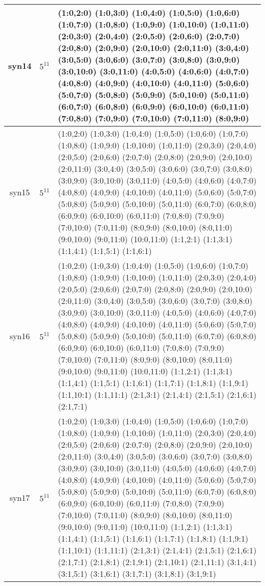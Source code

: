 \documentclass[10pt,journal,compsoc]{IEEEtran}
\begin{document}
\begin{table*}[htbp]
\begin{tabular}{|c|c|m{}|}
syn14 & $5^{11}$ & (1:0,2:0) (1:0,3:0) (1:0,4:0) (1:0,5:0) (1:0,6:0) (1:0,7:0) (1:0,8:0) (1:0,9:0) (1:0,10:0) (1:0,11:0) (2:0,3:0) (2:0,4:0) (2:0,5:0) (2:0,6:0) (2:0,7:0) (2:0,8:0) (2:0,9:0) (2:0,10:0) (2:0,11:0) (3:0,4:0) (3:0,5:0) (3:0,6:0) (3:0,7:0) (3:0,8:0) (3:0,9:0) (3:0,10:0) (3:0,11:0) (4:0,5:0) (4:0,6:0) (4:0,7:0) (4:0,8:0) (4:0,9:0) (4:0,10:0) (4:0,11:0) (5:0,6:0) (5:0,7:0) (5:0,8:0) (5:0,9:0) (5:0,10:0) (5:0,11:0) (6:0,7:0) (6:0,8:0) (6:0,9:0) (6:0,10:0) (6:0,11:0) (7:0,8:0) (7:0,9:0) (7:0,10:0) (7:0,11:0) (8:0,9:0)  \\ \hline
syn15 & $5^{11}$ & (1:0,2:0) (1:0,3:0) (1:0,4:0) (1:0,5:0) (1:0,6:0) (1:0,7:0) (1:0,8:0) (1:0,9:0) (1:0,10:0) (1:0,11:0) (2:0,3:0) (2:0,4:0) (2:0,5:0) (2:0,6:0) (2:0,7:0) (2:0,8:0) (2:0,9:0) (2:0,10:0) (2:0,11:0) (3:0,4:0) (3:0,5:0) (3:0,6:0) (3:0,7:0) (3:0,8:0) (3:0,9:0) (3:0,10:0) (3:0,11:0) (4:0,5:0) (4:0,6:0) (4:0,7:0) (4:0,8:0) (4:0,9:0) (4:0,10:0) (4:0,11:0) (5:0,6:0) (5:0,7:0) (5:0,8:0) (5:0,9:0) (5:0,10:0) (5:0,11:0) (6:0,7:0) (6:0,8:0) (6:0,9:0) (6:0,10:0) (6:0,11:0) (7:0,8:0) (7:0,9:0) (7:0,10:0) (7:0,11:0) (8:0,9:0) (8:0,10:0) (8:0,11:0) (9:0,10:0) (9:0,11:0) (10:0,11:0) (1:1,2:1) (1:1,3:1) (1:1,4:1) (1:1,5:1) (1:1,6:1)  \\ \hline
syn16 & $5^{11}$ & (1:0,2:0) (1:0,3:0) (1:0,4:0) (1:0,5:0) (1:0,6:0) (1:0,7:0) (1:0,8:0) (1:0,9:0) (1:0,10:0) (1:0,11:0) (2:0,3:0) (2:0,4:0) (2:0,5:0) (2:0,6:0) (2:0,7:0) (2:0,8:0) (2:0,9:0) (2:0,10:0) (2:0,11:0) (3:0,4:0) (3:0,5:0) (3:0,6:0) (3:0,7:0) (3:0,8:0) (3:0,9:0) (3:0,10:0) (3:0,11:0) (4:0,5:0) (4:0,6:0) (4:0,7:0) (4:0,8:0) (4:0,9:0) (4:0,10:0) (4:0,11:0) (5:0,6:0) (5:0,7:0) (5:0,8:0) (5:0,9:0) (5:0,10:0) (5:0,11:0) (6:0,7:0) (6:0,8:0) (6:0,9:0) (6:0,10:0) (6:0,11:0) (7:0,8:0) (7:0,9:0) (7:0,10:0) (7:0,11:0) (8:0,9:0) (8:0,10:0) (8:0,11:0) (9:0,10:0) (9:0,11:0) (10:0,11:0) (1:1,2:1) (1:1,3:1) (1:1,4:1) (1:1,5:1) (1:1,6:1) (1:1,7:1) (1:1,8:1) (1:1,9:1) (1:1,10:1) (1:1,11:1) (2:1,3:1) (2:1,4:1) (2:1,5:1) (2:1,6:1) (2:1,7:1)  \\ \hline
syn17 & $5^{11}$ & (1:0,2:0) (1:0,3:0) (1:0,4:0) (1:0,5:0) (1:0,6:0) (1:0,7:0) (1:0,8:0) (1:0,9:0) (1:0,10:0) (1:0,11:0) (2:0,3:0) (2:0,4:0) (2:0,5:0) (2:0,6:0) (2:0,7:0) (2:0,8:0) (2:0,9:0) (2:0,10:0) (2:0,11:0) (3:0,4:0) (3:0,5:0) (3:0,6:0) (3:0,7:0) (3:0,8:0) (3:0,9:0) (3:0,10:0) (3:0,11:0) (4:0,5:0) (4:0,6:0) (4:0,7:0) (4:0,8:0) (4:0,9:0) (4:0,10:0) (4:0,11:0) (5:0,6:0) (5:0,7:0) (5:0,8:0) (5:0,9:0) (5:0,10:0) (5:0,11:0) (6:0,7:0) (6:0,8:0) (6:0,9:0) (6:0,10:0) (6:0,11:0) (7:0,8:0) (7:0,9:0) (7:0,10:0) (7:0,11:0) (8:0,9:0) (8:0,10:0) (8:0,11:0) (9:0,10:0) (9:0,11:0) (10:0,11:0) (1:1,2:1) (1:1,3:1) (1:1,4:1) (1:1,5:1) (1:1,6:1) (1:1,7:1) (1:1,8:1) (1:1,9:1) (1:1,10:1) (1:1,11:1) (2:1,3:1) (2:1,4:1) (2:1,5:1) (2:1,6:1) (2:1,7:1) (2:1,8:1) (2:1,9:1) (2:1,10:1) (2:1,11:1) (3:1,4:1) (3:1,5:1) (3:1,6:1) (3:1,7:1) (3:1,8:1) (3:1,9:1)  \\ \hline

\end{tabular}
\end{table*}
\end{document}
